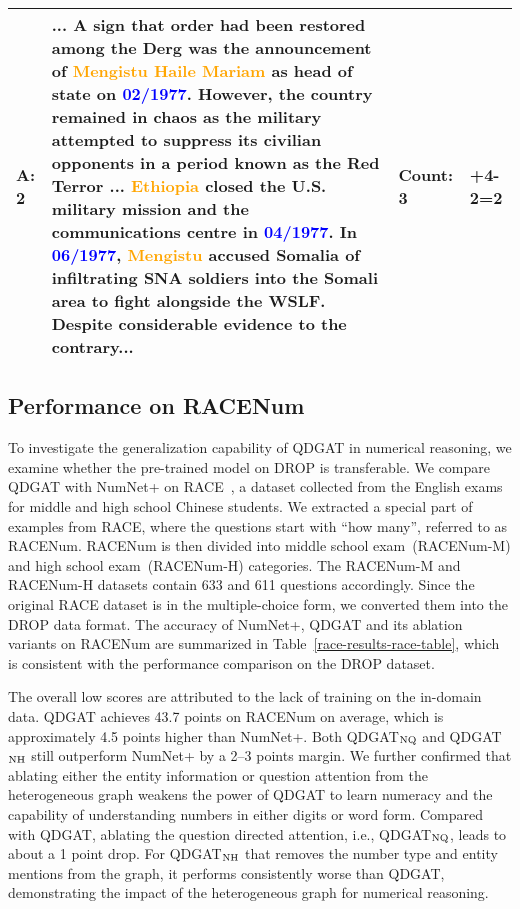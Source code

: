 \documentclass{article}
\begin{document}
\begin{table*}[!h]
\begin{center}
\begin{tabularx}{\linewidth}{JiKK}
\textbf{A:} 2 & ... A sign that order had been restored among the Derg was the announcement of \textcolor{orange}{Mengistu Haile Mariam} as head of state on \textcolor{blue}{02/1977}. However, the country remained in chaos as the military attempted to suppress its civilian opponents in a period known as the Red Terror ... \textcolor{orange}{Ethiopia} closed the U.S. military mission and the communications centre in \textcolor{blue}{04/1977}. In \textcolor{blue}{06/1977}, \textcolor{orange}{Mengistu} accused Somalia of infiltrating SNA soldiers into the Somali area to fight alongside the WSLF. Despite considerable evidence to the contrary... & Count: 3 &+4-2=2 \\
\bottomrule
\end{tabularx}
\end{center}
\label{tab:cases}
\end{table*}



\subsection{Performance on RACENum}
To investigate the generalization capability of QDGAT in numerical reasoning, we examine whether the pre-trained model on DROP is transferable.
We compare QDGAT with NumNet+ on RACE~\cite{lai-etal-2017-race}, a dataset collected from the English exams for middle and high school Chinese students.  
We extracted a special part of examples from RACE, where the questions start with ``how many'', referred to as RACENum.
RACENum is then divided into middle school exam~(RACENum-M) and high school exam~(RACENum-H) categories.
The RACENum-M and RACENum-H datasets contain 633 and 611 questions accordingly.
Since the original RACE dataset is in the multiple-choice form, we converted them into the DROP data format.
The accuracy of NumNet+, QDGAT and its ablation variants on RACENum are summarized in Table~\ref{race-results-race-table}, which is consistent with the performance comparison on the DROP dataset.


The overall low scores are attributed to the lack of training on the in-domain data.
QDGAT achieves 43.7 points on RACENum on average, which is approximately 4.5 points higher than NumNet+.
Both QDGAT$_{\rm NQ}$ and QDGAT$_{\rm NH}$ still outperform NumNet+ by a 2--3 points margin.
We further confirmed that ablating either the entity information or question attention from the heterogeneous graph weakens the power of QDGAT to learn numeracy and the capability of understanding numbers in either digits or word form. 
Compared with QDGAT, ablating the question directed attention, i.e., QDGAT$_{\rm NQ}$, leads to about a 1 point drop. For QDGAT$_{\rm NH}$ that removes the number type and entity mentions from the graph, it performs consistently worse than QDGAT, demonstrating the impact of the heterogeneous graph for numerical reasoning. 
\end{document}
